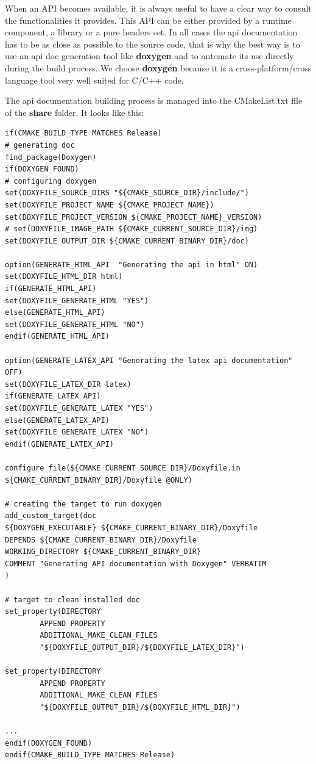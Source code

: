 \documentclass[12pt,a4paper]{article}
\begin{document}
When an API becomes available, it is always useful to have a clear way to consult the functionalities it provides. This API can be either provided by a runtime component, a library or a pure headers set. In all cases the api documentation has to be as close as possible to the source code, that is why the best way is to use an api doc generation tool like \textbf{doxygen} and to automate its use directly during the build process. We choose \textbf{doxygen} because it is a cross-platform/cross language tool very well suited for C/C++ code.

The api documentation building process is managed into the CMakeList.txt file of the \textbf{share} folder. It looks like this:

\begin{verbatim}
if(CMAKE_BUILD_TYPE MATCHES Release)
# generating doc
find_package(Doxygen)
if(DOXYGEN_FOUND)
# configuring doxygen
set(DOXYFILE_SOURCE_DIRS "${CMAKE_SOURCE_DIR}/include/")
set(DOXYFILE_PROJECT_NAME ${CMAKE_PROJECT_NAME})
set(DOXYFILE_PROJECT_VERSION ${CMAKE_PROJECT_NAME}_VERSION)
# set(DOXYFILE_IMAGE_PATH ${CMAKE_CURRENT_SOURCE_DIR}/img)
set(DOXYFILE_OUTPUT_DIR ${CMAKE_CURRENT_BINARY_DIR}/doc)

option(GENERATE_HTML_API  "Generating the api in html" ON)
set(DOXYFILE_HTML_DIR html)
if(GENERATE_HTML_API)
set(DOXYFILE_GENERATE_HTML "YES")
else(GENERATE_HTML_API)
set(DOXYFILE_GENERATE_HTML "NO")
endif(GENERATE_HTML_API)

option(GENERATE_LATEX_API "Generating the latex api documentation" OFF)
set(DOXYFILE_LATEX_DIR latex)
if(GENERATE_LATEX_API)
set(DOXYFILE_GENERATE_LATEX "YES")
else(GENERATE_LATEX_API)
set(DOXYFILE_GENERATE_LATEX "NO")
endif(GENERATE_LATEX_API)
 		
configure_file(${CMAKE_CURRENT_SOURCE_DIR}/Doxyfile.in 
${CMAKE_CURRENT_BINARY_DIR}/Doxyfile @ONLY)

# creating the target to run doxygen
add_custom_target(doc
${DOXYGEN_EXECUTABLE} ${CMAKE_CURRENT_BINARY_DIR}/Doxyfile
DEPENDS ${CMAKE_CURRENT_BINARY_DIR}/Doxyfile
WORKING_DIRECTORY ${CMAKE_CURRENT_BINARY_DIR}
COMMENT "Generating API documentation with Doxygen" VERBATIM
)

# target to clean installed doc
set_property(DIRECTORY 
		APPEND PROPERTY
		ADDITIONAL_MAKE_CLEAN_FILES
		"${DOXYFILE_OUTPUT_DIR}/${DOXYFILE_LATEX_DIR}")

set_property(DIRECTORY 
		APPEND PROPERTY
		ADDITIONAL_MAKE_CLEAN_FILES
		"${DOXYFILE_OUTPUT_DIR}/${DOXYFILE_HTML_DIR}")
				
...
endif(DOXYGEN_FOUND)
endif(CMAKE_BUILD_TYPE MATCHES Release)
\end{verbatim}
\end{document}
